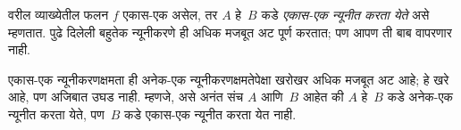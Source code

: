 \documentclass[../../../include/open-logic-section]{subfiles}
\begin{document}
वरील व्याख्येतील फलन $f$ एकास-एक असेल, तर $A$ हे~$B$
कडे \emph{एकास-एक न्यूनीत करता येते} असे म्हणतात.
पुढे दिलेली बहुतेक न्यूनीकरणे ही अधिक मजबूत अट पूर्ण करतात;
पण आपण ती बाब वापरणार नाही.

\begin{digress}
एकास-एक न्यूनीकरणक्षमता ही अनेक-एक न्यूनीकरणक्षमतेपेक्षा खरोखर
अधिक मजबूत अट आहे; हे खरे आहे, पण अजिबात उघड नाही. म्हणजे,
असे अनंत संच $A$ आणि~$B$ आहेत की $A$ हे~$B$ कडे अनेक-एक
न्यूनीत करता येते, पण~$B$ कडे एकास-एक न्यूनीत करता येत नाही.
\end{digress}
\end{document}
